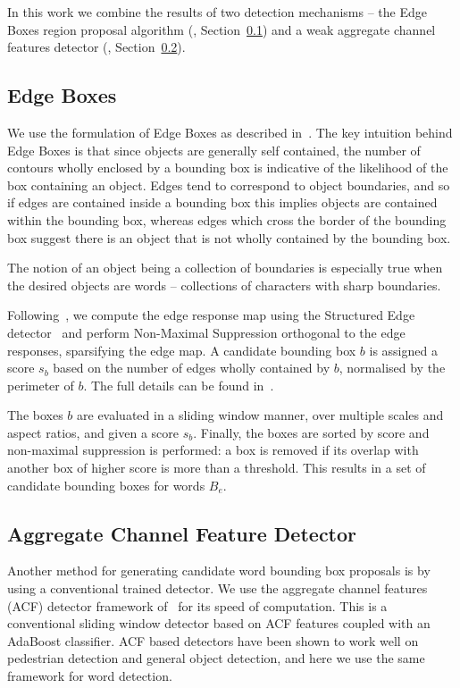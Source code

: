 \documentclass[twocolumn]{svjour3}          \smartqed  \usepackage{epsfig}
\begin{document}
In this work we combine the results of two detection mechanisms -- the Edge Boxes region proposal algorithm (\cite{Zitnick14}, Section~\ref{sec:edgeboxes}) and a weak aggregate channel features detector (\cite{Dollar14}, Section~\ref{sec:detector}). 

\subsection{Edge Boxes}
\label{sec:edgeboxes}
We use the formulation of Edge Boxes as described in~\cite{Zitnick14}. The key intuition behind Edge Boxes is that since objects are generally self contained, the number of contours wholly enclosed by a bounding box is indicative of the likelihood of the box containing an object. Edges tend to correspond to object boundaries, and so if edges are contained inside a bounding box this implies objects are contained within the bounding box, whereas edges which cross the border of the bounding box suggest there is an object that is not wholly contained by the bounding box.

The notion of an object being a collection of boundaries is especially true when the desired objects are words -- collections of characters with sharp boundaries.

Following~\cite{Zitnick14}, we compute the edge response map using the Structured Edge detector~\cite{Dollar13,Dollar14b} and perform Non-Maximal Suppression orthogonal to the edge responses, sparsifying the edge map. A candidate bounding box $b$ is assigned a score $s_b$ based on the number of edges wholly contained by $b$, normalised by the perimeter of $b$. The full details can be found in~\cite{Zitnick14}.

The boxes $b$ are evaluated in a sliding window manner, over multiple scales and aspect ratios, and given a score $s_b$. Finally, the boxes are sorted by score and non-maximal suppression is performed: a box is removed if its overlap with another box of higher score is more than a threshold. This results in a set of candidate bounding boxes for words $B_e$.

\subsection{Aggregate Channel Feature Detector}
\label{sec:detector}
Another method for generating candidate word bounding box proposals is by using a conventional trained detector. We use the aggregate channel features (ACF) detector framework of~\cite{Dollar14} for its speed of computation. This is a conventional sliding window detector based on ACF features coupled with an AdaBoost classifier. ACF based detectors have been shown to work well on pedestrian detection and general object detection, and here we use the same framework for word detection.
\end{document}
